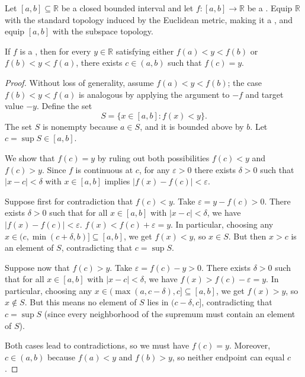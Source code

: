 \begin{theorem} \label{theorem:intermediate_value_theorem_for_continuous_functions_on_intervals}
    Let $[a, b] \subseteq \mathbb{R}$ be a closed bounded interval and let $f : [a, b] \to \mathbb{R}$ be a . Equip $\mathbb{R}$ with the standard topology induced by the Euclidean metric, making it a , and equip $[a, b]$ with the subspace topology.

    If $f$ is a , then for every $y \in \mathbb{R}$ satisfying either $f(a) < y < f(b)$ or $f(b) < y < f(a)$, there exists $c \in (a, b)$ such that $f(c) = y$.
\end{theorem}

\begin{proof}
    Without loss of generality, assume $f(a) < y < f(b)$; the case $f(b) < y < f(a)$ is analogous by applying the argument to $-f$ and target value $-y$. 
    Define the set
    $$S = \{ x \in [a, b] : f(x) < y \}.$$
    The set $S$ is nonempty because $a \in S$, and it is bounded above by $b$. Let $c = \sup S \in [a, b]$.

    We show that $f(c) = y$ by ruling out both possibilities $f(c) < y$ and $f(c) > y$. Since $f$ is continuous at $c$, for any $\varepsilon > 0$ there exists $\delta > 0$ such that $|x - c| < \delta$ with $x \in [a, b]$ implies $|f(x) - f(c)| < \varepsilon$.

    Suppose first for contradiction that $f(c) < y$. Take $\varepsilon = y - f(c) > 0$. There exists $\delta > 0$ such that for all $x \in [a, b]$ with $|x - c| < \delta$, we have $|f(x)-f(c)| < \varepsilon$. $f(x) < f(c) + \varepsilon = y$. In particular, choosing any $x \in (c, \min(c + \delta, b)] \subseteq [a, b]$, we get $f(x) < y$, so $x \in S$. But then $x > c$ is an element of $S$, contradicting that $c = \sup S$.

    Suppose now that $f(c) > y$. Take $\varepsilon = f(c) - y > 0$. There exists $\delta > 0$ such that for all $x \in [a, b]$ with $|x - c| < \delta$, we have $f(x) > f(c) - \varepsilon = y$. In particular, choosing any $x \in (\max(a, c - \delta), c] \subseteq [a, b]$, we get $f(x) > y$, so $x \notin S$. But this means no element of $S$ lies in $(c - \delta, c]$, contradicting that $c = \sup S$ (since every neighborhood of the supremum must contain an element of $S$).

    Both cases lead to contradictions, so we must have $f(c) = y$. Moreover, $c \in (a, b)$ because $f(a) < y$ and $f(b) > y$, so neither endpoint can equal $c$.
\end{proof}
